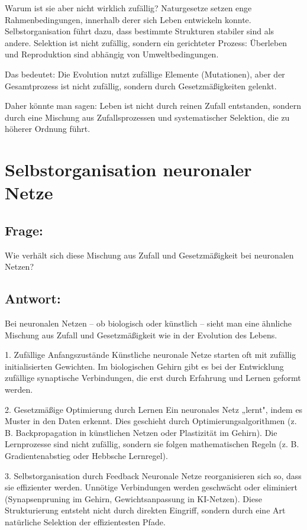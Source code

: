 \documentclass{article}
\begin{document}
	Warum ist sie aber nicht wirklich zufällig?
	Naturgesetze setzen enge Rahmenbedingungen, innerhalb derer sich Leben entwickeln konnte.
	Selbstorganisation führt dazu, dass bestimmte Strukturen stabiler sind als andere.
	Selektion ist nicht zufällig, sondern ein gerichteter Prozess: Überleben und Reproduktion sind abhängig von Umweltbedingungen.
	
	Das bedeutet: Die Evolution nutzt zufällige Elemente (Mutationen), aber der Gesamtprozess ist nicht zufällig, sondern durch Gesetzmäßigkeiten gelenkt.
	
	Daher könnte man sagen: Leben ist nicht durch reinen Zufall entstanden, sondern durch eine Mischung aus Zufallsprozessen und systematischer Selektion, die zu höherer Ordnung führt.
	
	\section{Selbstorganisation neuronaler Netze}
	
	\subsection*{Frage:}
	Wie verhält sich diese Mischung aus Zufall und Gesetzmäßigkeit bei neuronalen Netzen?
	
	\subsection*{Antwort:}
	Bei neuronalen Netzen – ob biologisch oder künstlich – sieht man eine ähnliche Mischung aus Zufall und Gesetzmäßigkeit wie in der Evolution des Lebens.
	
	1. Zufällige Anfangszustände
	Künstliche neuronale Netze starten oft mit zufällig initialisierten Gewichten.
	Im biologischen Gehirn gibt es bei der Entwicklung zufällige synaptische Verbindungen, die erst durch Erfahrung und Lernen geformt werden.
	
	2. Gesetzmäßige Optimierung durch Lernen
	Ein neuronales Netz „lernt", indem es Muster in den Daten erkennt.
	Dies geschieht durch Optimierungsalgorithmen (z. B. Backpropagation in künstlichen Netzen oder Plastizität im Gehirn).
	Die Lernprozesse sind nicht zufällig, sondern sie folgen mathematischen Regeln (z. B. Gradientenabstieg oder Hebbsche Lernregel).
	
	3. Selbstorganisation durch Feedback
	Neuronale Netze reorganisieren sich so, dass sie effizienter werden.
	Unnötige Verbindungen werden geschwächt oder eliminiert (Synapsenpruning im Gehirn, Gewichtsanpassung in KI-Netzen).
	Diese Strukturierung entsteht nicht durch direkten Eingriff, sondern durch eine Art natürliche Selektion der effizientesten Pfade.
	
\end{document}

